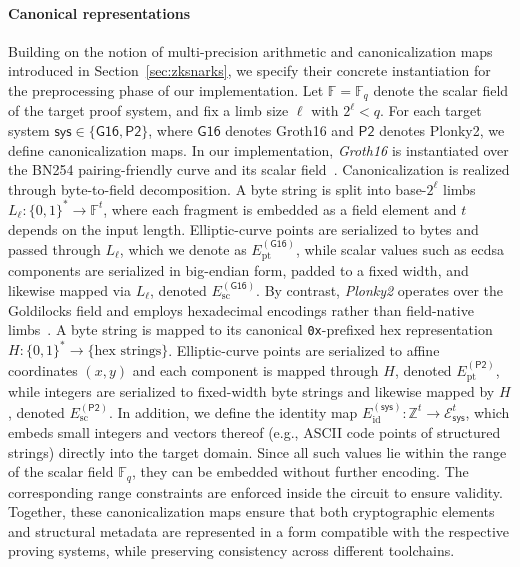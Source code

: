 \paragraph{Canonical representations}
Building on the notion of multi-precision arithmetic and canonicalization maps introduced in Section~\ref{sec:zksnarks}, we specify their concrete instantiation for the preprocessing phase of our implementation. Let $\mathbb{F}=\mathbb{F}_q$ denote the scalar field of the target proof system, and fix a limb size $\ell$ with $2^{\ell}<q$. For each target system $\mathsf{sys}\in\{\mathsf{G16},\mathsf{P2}\}$, where $\mathsf{G16}$ denotes Groth16 and $\mathsf{P2}$ denotes Plonky2, we define canonicalization maps. In our implementation, \emph{Groth16} is instantiated over the BN254 pairing-friendly curve and its scalar field~\cite{cryptoeprint:2005/133,circomdocs}. Canonicalization is realized through byte-to-field decomposition. A byte string is split into base-$2^\ell$ limbs $L_\ell:\{0,1\}^* \to \mathbb{F}^t$, where each fragment is embedded as a field element and $t$ depends on the input length. Elliptic-curve points are serialized to bytes and passed through $L_\ell$, which we denote as $E_{\mathrm{pt}}^{(\mathsf{G16})}$, while scalar values such as \acrshort{ecdsa} components are serialized in big-endian form, padded to a fixed width, and likewise mapped via $L_\ell$, denoted $E_{\mathrm{sc}}^{(\mathsf{G16})}$. By contrast, \emph{Plonky2} operates over the Goldilocks field and employs hexadecimal encodings rather than field-native limbs~\cite{Plonky2Draft2022}. A byte string is mapped to its canonical \texttt{0x}-prefixed hex representation $H:\{0,1\}^* \to \{\text{hex strings}\}$. Elliptic-curve points are serialized to affine coordinates $(x,y)$ and each component is mapped through $H$, denoted $E_{\mathrm{pt}}^{(\mathsf{P2})}$, while integers are serialized to fixed-width byte strings and likewise mapped by $H$, denoted $E_{\mathrm{sc}}^{(\mathsf{P2})}$. In addition, we define the identity map $E_{\mathrm{id}}^{(\mathsf{sys})}:\mathbb{Z}^t \to \mathcal{E}_{\mathsf{sys}}^t$, which embeds small integers and vectors thereof (e.g., ASCII code points of structured strings) directly into the target domain. Since all such values lie within the range of the scalar field $\mathbb{F}_q$, they can be embedded without further encoding. The corresponding range constraints are enforced inside the circuit to ensure validity. Together, these canonicalization maps ensure that both cryptographic elements and structural metadata are represented in a form compatible with the respective proving systems, while preserving consistency across different toolchains.

